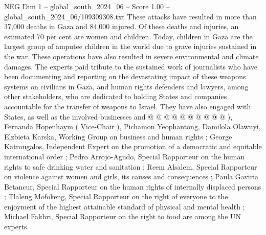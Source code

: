 \begin{textsample}{NEG Dim 1 – global\_south\_2024\_06 – Score 1.00 – global\_south\_2024\_06/109309308.txt}
These attacks have resulted in more than 37,000 deaths in Gaza and 84,000 injured.
Of these deaths and injuries, an estimated 70 per cent are women and children.
Today, children in Gaza are the largest group of amputee children in the world due to grave injuries sustained in the war.
These operations have also resulted in severe environmental and climate damages.
The experts paid tribute to the sustained work of journalists who have been documenting and reporting on the devastating impact of these weapons systems on civilians in Gaza, and human rights defenders and lawyers, among other stakeholders, who are dedicated to holding States and companies accountable for the transfer of weapons to Israel.
They have also engaged with States, as well as the involved businesses and @ @ @ @ @ @ @ @ @ @ ), Fernanda Hopenhaym ( Vice-Chair ), Pichamon Yeophantong, Damilola Olawuyi, Elzbieta Karska, Working Group on business and human rights ; George Katrougalos, Independent Expert on the promotion of a democratic and equitable international order ; Pedro Arrojo-Agudo, Special Rapporteur on the human rights to safe drinking water and sanitation ; Reem Alsalem, Special Rapporteur on violence against women and girls, its causes and consequences ; Paula Gaviria Betancur, Special Rapporteur on the human rights of internally displaced persons ; Tlaleng Mofokeng, Special Rapporteur on the right of everyone to the enjoyment of the highest attainable standard of physical and mental health ; Michael Fakhri, Special Rapporteur on the right to food are among the UN experts.

\end{textsample}
